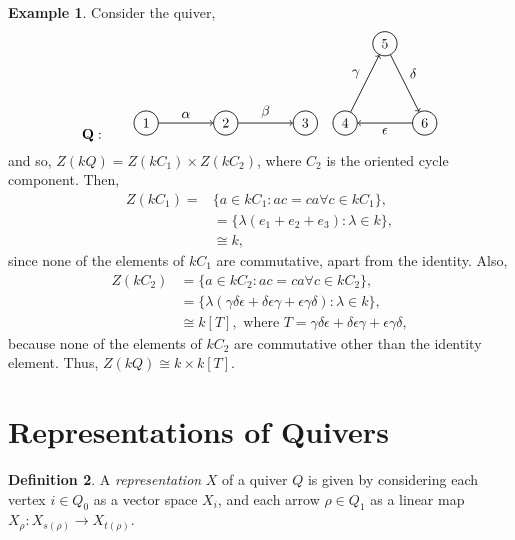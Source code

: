 \documentclass[11.5pt, twoside, a4paper, titlepage]{report}
\providecommand{\equ}[0]{\begin{equation*}}
\providecommand{\eequ}[0] {\end{equation*}}
\theoremstyle{definition}
\newtheorem{mydef}{Definition}[section]
\newtheorem{eg}[mydef]{Example}
\theoremstyle{plain}
\begin{document}
\begin{eg}
Consider the quiver, 
\equ
\mathbf{Q}: \qquad
\begin{tikzpicture}[->,-latex, auto, every path/.style={->, semithick}, main node/.style={draw, circle}]
\node	[main node]		(1) at (0,0)		{1};
\node [main node]		(2) at (2,0)		{2};
\node [main node]		(3) at (4,0)		{3};
\node [main node]		(4) at (5,0)		{4};
\node [main node]		(5) at (6,2)		{5};
\node [main node]		(6) at (7, 0)		{6};

\draw (1) edge node [auto] {$\alpha$} (2);
\draw (2) edge node [auto] {$\beta$} (3);
\draw (4) edge node [auto] {$\gamma$} (5);
\draw (5) edge node [auto] {$\delta$} (6);
\draw (6) edge node [auto] {$\epsilon$} (4);
\end{tikzpicture}
\eequ
and so, $Z(kQ)=Z(kC_1) \times Z(kC_2)$, where $C_2$ is the oriented cycle component. Then, 
\begin{align*}
Z(kC_1)=&\{a \in kC_1: ac=ca \forall c\in kC_1\}, \\
&=\{\lambda(e_1+e_2+e_3): \lambda\in k\}, \\
&\cong k,
\end{align*}
since none of the elements of $kC_1$ are commutative, apart from the identity. Also, 
\begin{align*}
Z(kC_2) &=\{a \in kC_2: ac=ca \forall c\in kC_2\},\\
&=\{\lambda(\gamma\delta\epsilon + \delta\epsilon\gamma +\epsilon\gamma\delta): \lambda \in k\}, \\
&\cong k[T], \text{ where }T=\gamma\delta\epsilon + \delta\epsilon\gamma +\epsilon\gamma\delta, 
\end{align*}
because none of the elements of $kC_2$ are commutative other than the identity element. Thus, $Z(kQ)\cong k \times k[T]$.
\end{eg}


\section{Representations of Quivers}

\begin{mydef}
A \emph{representation} $X$ of a quiver $Q$ is given by considering each vertex $i\in Q_0$ as a vector space $X_i$, and each arrow $\rho \in Q_1$ as a linear map $X_\rho: X_{s(\rho)} \to X_{t(\rho)}$.
\end{mydef}
\end{document}
